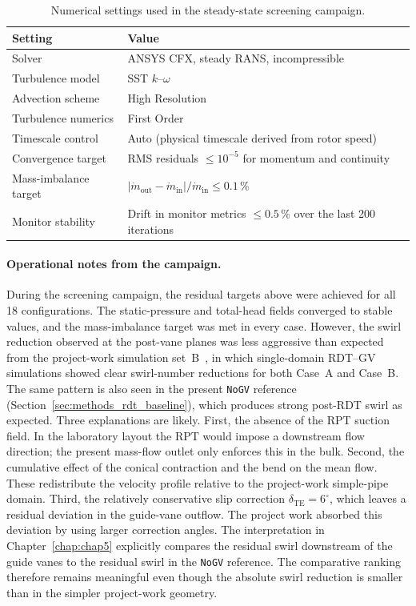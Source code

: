 \begin{table}[h!]
  \centering
  \caption[Solver settings, screening campaign]{Numerical settings used in the steady-state screening campaign.}
  \label{tab:cfx_settings_master}
  \small
  \begin{tabular}{l l}
    \toprule
    \textbf{Setting} & \textbf{Value} \\
    \midrule
    Solver                       & ANSYS CFX, steady RANS, incompressible \\
    Turbulence model             & SST $k$--$\omega$ \\
    Advection scheme             & High Resolution \\
    Turbulence numerics          & First Order\\
    Timescale control            & Auto (physical timescale derived from rotor speed) \\
    Convergence target           & RMS residuals $\leq 10^{-5}$ for momentum and continuity \\
    Mass-imbalance target        & $|\dot m_{\mathrm{out}} - \dot m_{\mathrm{in}}|/\dot m_{\mathrm{in}} \leq 0.1\,\%$ \\
    Monitor stability            & Drift in monitor metrics $\leq 0.5\,\%$ over the last 200 iterations \\
    \bottomrule
  \end{tabular}
\end{table}
 
\paragraph{Operational notes from the campaign.}
During the screening campaign, the residual targets above were achieved for all 18 configurations. The static-pressure and total-head fields converged to stable values, and the mass-imbalance target was met in every case. However, the swirl reduction observed at the post-vane planes was less aggressive than expected from the project-work simulation set~B~\cite{Leonsen2025}, in which single-domain RDT--GV simulations showed clear swirl-number reductions for both Case~A and Case~B. The same pattern is also seen in the present \texttt{NoGV} reference (Section~\ref{sec:methods_rdt_baseline}), which produces strong post-RDT swirl as expected. Three explanations are likely. First, the absence of the RPT suction field. In the laboratory layout the RPT would impose a downstream flow direction; the present mass-flow outlet only enforces this in the bulk. Second, the cumulative effect of the conical contraction and the bend on the mean flow. These redistribute the velocity profile relative to the project-work simple-pipe domain. Third, the relatively conservative slip correction $\delta_{\mathrm{TE}} = 6^\circ$, which leaves a residual deviation in the guide-vane outflow. The project work absorbed this deviation by using larger correction angles. The interpretation in Chapter~\ref{chap:chap5} explicitly compares the residual swirl downstream of the guide vanes to the residual swirl in the \texttt{NoGV} reference. The comparative ranking therefore remains meaningful even though the absolute swirl reduction is smaller than in the simpler project-work geometry.
 

